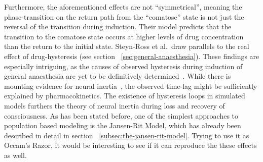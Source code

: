 Furthermore, the aforementioned effects are not ``symmetrical'',
meaning the phase-transition on the return path from the ``comatose'' state is not just the reversal of the transition
during induction.
Their model predicts that the transition to the comatose state occurs at higher levels of drug concentration than
the return to the initial state.
Steyn-Ross et al.\ draw parallels to the real effect of drug-hysteresis (see section ~\ref{sec:general-anaesthesia}).
These findings are especially intriguing, as the causes of observed hysteresis during induction of general
anaesthesia are yet to be definitively determined~\cite{kuizenga_test_2018, sepulveda_evidence_2018}.
While there is mounting evidence for neural inertia~\cite{ferreira_patterns_2020},
the observed time-lag might be sufficiently explained by pharmacokinetics.
The existence of hysteresis loops in simulated models furthers the theory of neural inertia during loss and recovery
of consciousness.
As has been stated before, one of the simplest approaches to population based modeling is the Jansen-Rit Model,
which has already been described in detail in section ~\ref{subsec:the-jansen-rit-model}.
Trying to use it as Occam's Razor, it would be interesting to see if it can reproduce the these effects as well.
